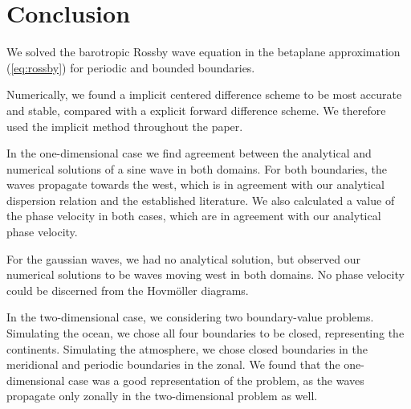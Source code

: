 \section{Conclusion}
\label{sec:conclusion}
We solved the barotropic Rossby wave equation in the betaplane approximation (\ref{eq:rossby}) for periodic and bounded boundaries.

Numerically, we found a implicit centered difference scheme to be most accurate and stable, compared with a explicit forward difference scheme. We therefore used the implicit method throughout the paper.

In the one-dimensional case we find agreement between the analytical and numerical solutions of a sine wave in both domains. For both boundaries, the waves propagate towards the west, which is in agreement with our analytical dispersion relation and the established literature. We also calculated a value of the phase velocity in both cases, which are in agreement with our analytical phase velocity.

For the gaussian waves, we had no analytical solution, but observed our numerical solutions to be waves moving west in both domains. No phase velocity could be discerned from the Hovmöller diagrams.

In the two-dimensional case, we considering two boundary-value problems. Simulating the ocean, we chose all four boundaries to be closed, representing the continents. Simulating the atmosphere, we chose closed boundaries in the meridional and periodic boundaries in the zonal. We found that the one-dimensional case was a good representation of the problem, as the waves propagate only zonally in the two-dimensional problem as well.